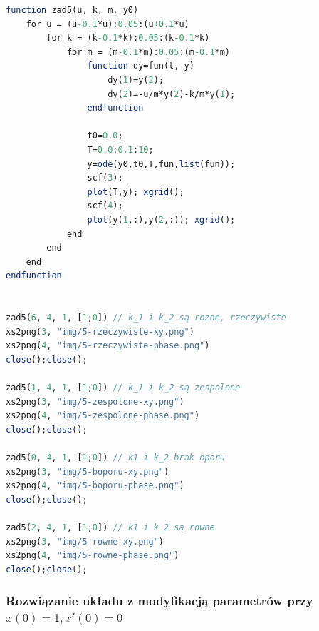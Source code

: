 \documentclass[12pt]{article}
\begin{document}
\begin{lstlisting}[label={code1},language=scilab,caption={Kod generujący wykresy}]
function zad5(u, k, m, y0)
    for u = (u-0.1*u):0.05:(u+0.1*u)
        for k = (k-0.1*k):0.05:(k-0.1*k)
            for m = (m-0.1*m):0.05:(m-0.1*m)
                function dy=fun(t, y)
                    dy(1)=y(2);
                    dy(2)=-u/m*y(2)-k/m*y(1);
                endfunction
                
                t0=0.0;
                T=0.0:0.1:10;
                y=ode(y0,t0,T,fun,list(fun));
                scf(3);
                plot(T,y); xgrid();
                scf(4);
                plot(y(1,:),y(2,:)); xgrid();
            end
        end
    end
endfunction


zad5(6, 4, 1, [1;0]) // k_1 i k_2 są rozne, rzeczywiste
xs2png(3, "img/5-rzeczywiste-xy.png")
xs2png(4, "img/5-rzeczywiste-phase.png")
close();close();

zad5(1, 4, 1, [1;0]) // k_1 i k_2 są zespolone
xs2png(3, "img/5-zespolone-xy.png")
xs2png(4, "img/5-zespolone-phase.png")
close();close();

zad5(0, 4, 1, [1;0]) // k1 i k_2 brak oporu
xs2png(3, "img/5-boporu-xy.png")
xs2png(4, "img/5-boporu-phase.png")
close();close();

zad5(2, 4, 1, [1;0]) // k1 i k_2 są rowne
xs2png(3, "img/5-rowne-xy.png")
xs2png(4, "img/5-rowne-phase.png")
close();close();
\end{lstlisting}

\subsubsection{Rozwiązanie układu z modyfikacją parametrów przy $x(0)=1, x'(0)=0$}
\end{document}
